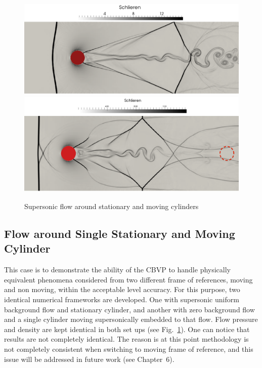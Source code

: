 \begin{figure}[h!]
\centering \includegraphics[scale=0.21]{fig/nonmov_res.png}\\
\centering \includegraphics[scale=0.2]{fig/moving_res.png}
\caption{Supersonic flow around stationary and moving cylinders \label{fig:mov_res}}
\end{figure}
\subsection{Flow around Single Stationary and Moving Cylinder}
This case is to demonstrate the ability of the CBVP to handle physically equivalent phenomena considered from two different frame of references, moving and non moving, within the acceptable level accuracy. For this purpose, two identical numerical frameworks are developed. One with supersonic uniform background flow and stationary cylinder, and another with zero background flow and a single cylinder moving supersonically embedded to that flow. Flow pressure and density are kept identical in both set ups (see Fig.~\ref{fig:mov_res}). One can notice that results are not completely identical. The reason is at this point methodology is not completely consistent when switching to moving frame of reference, and this issue will be addressed in future work (see Chapter~6).